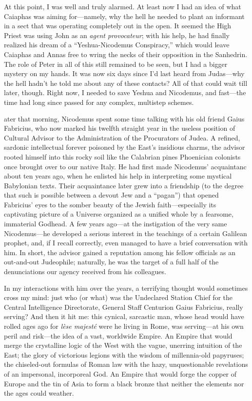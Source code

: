 At this point, I was well and truly alarmed. At least now I had an idea of what Caiaphas was aiming for---namely, why the hell he needed to plant an informant in a sect that was operating completely out in the open. It seemed the High Priest was using John as an \emph{agent provocateur}; with his help, he had finally realized his dream of a ``Yeshua-Nicodemus Conspiracy,'' which would leave Caiaphas and Annas free to wring the necks of their opposition in the Sanhedrin. The role of Peter in all of this still remained to be seen, but I had a bigger mystery on my hands. It was now six days since I'd last heard from Judas---why the hell hadn't he told me about any of these contacts? All of that could wait till later, though. Right now, I needed to save Yeshua and Nicodemus, and fast---the time had long since passed for any complex, multistep schemes.

ater that morning, Nicodemus spent some time talking with his old friend Gaius Fabricius, who now marked his twelfth straight year in the useless position of Cultural Advisor to the Administration of the Procurators of Judea. A refined, sardonic intellectual forever poisoned by the East's insidious charms, the advisor rooted himself into this rocky soil like the Calabrian pines Phoenician colonists once brought over to our native Italy. He had first made Nicodemus' acquaintanc about ten years ago, when he enlisted his help in interpreting some mystical Babylonian texts. Their acquaintance later grew into a friendship (to the degree that such is possible between a devout Jew and a ``pagan'') that opened Fabricius' eyes to the somber beauty of the Jewish faith---especially its captivating picture of a Universe organized as a unified whole by a fearsome, immaterial Godhead. A few years ago---at the instigation of the very same Nicodemus---he developed a serious interest in the teachings of a certain Galilean prophet, and, if I recall correctly, even managed to have a brief conversation with him. In short, the advisor gained a reputation among his fellow officials as an out-and-out Judeophile; naturally, he was the target of a full half of the denunciations our agency received from his colleagues.

In my interactions with him over the years, a terrifying thought would sometimes cross my mind: just who (or what) was the Undeclared Station Chief for the Central Intelligence Directorate, General Staff Centurion Gaius Fabricius, really serving? And then it hit me: this cynical, sarcastic man, whose head would have rolled ages ago for \emph{lèse majesté} were he living in Rome, was serving---at his own peril and risk---the idea of a vast, worldwide Empire. An Empire that would merge the crystalline logic of the West with the vague, unerring intuition of the East; the glory of victorious legions with the wisdom of millennia-old papyruses; the chiseled-out formulas of Roman law with the hazy, unquestionable revelations of an impersonal, incorporeal God. An Empire that would forge the copper of Europe and the tin of Asia to form a black bronze that neither the elements nor the ages could weather.

